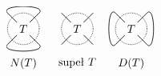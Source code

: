 \[
    \begin{tikzpicture}[baseline=-0.65ex, scale=0.1]
    \useasboundingbox (-5, -11) rectangle (5, 7);
        \draw[semithick] (-2, -2) to (-5,-5);
        \draw[semithick] (2, 2) to (5,5);
        \draw[semithick] (2, -2) to (5,-5);
        \draw[semithick] (-2, 2) to (-5,5);        %
        \draw[semithick, densely dotted] (-0, 0) circle (5);
        \node at (0, 0) {$T$};
        \node [below] at (0, -8) {$N(T)$};
        \draw[semithick] (-5, -5) [in=-45, out=-135] to (5, -5);        %
        \draw[semithick] (-5,    5) [in=45, out=135] to (5, 5);        %
    \end{tikzpicture}
    \quad \quad
    \begin{tikzpicture}[baseline=-0.65ex, scale=0.1]
    \useasboundingbox (-5, -11) rectangle (5, 7);
        \draw[semithick] (-2, -2) to (-5,-5);
        \draw[semithick] (2, 2) to (5,5);
        \draw[semithick] (2, -2) to (5,-5);
        \draw[semithick] (-2, 2) to (-5,5);        %
        \draw[semithick, densely dotted] (-0, 0) circle (5);
        \node at (0, 0) {$T$};
        \node [below] at (0, -8) {supeł $T$};
    \end{tikzpicture}
    \quad \quad
    \begin{tikzpicture}[baseline=-0.65ex, scale=0.1]
    \useasboundingbox (-5, -11) rectangle (5, 7);
        \draw[semithick] (-2, -2) to (-5,-5);
        \draw[semithick] (2, 2) to (5,5);
        \draw[semithick] (2, -2) to (5,-5);
        \draw[semithick] (-2, 2) to (-5,5);        %
        \draw[semithick, densely dotted] (-0, 0) circle (5);
        \node at (0, 0) {$T$};
        \node [below] at (0, -8) {$D(T)$};
        \draw[semithick] (-5, -5) [in=135, out=-135] to (-5, 5);        %
        \draw[semithick] (5, -5) [in=45, out=-45] to (5, 5);        %
    \end{tikzpicture}
    \quad \quad
\]
